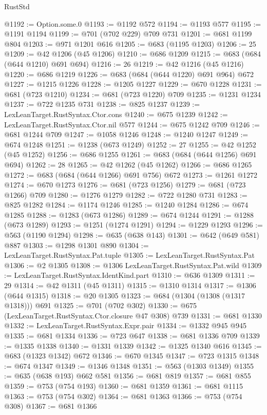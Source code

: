\begin{lexlean}{RustStd}
\begin{coremodule}
@1192 := Option.some.{0}
@1193 := @1192 @572
@1194 := @1193 @577
@1195 := @1191 @1194
@1199 := @701 (@702 @229) @709 @731
@1201 := @681 @1199 @804
@1203 := @971 @1201 @616
@1205 := @683 (@1195 @1203)
@1206 := 25
@1209 := @42 @1206 (@45 @1206)
@1210 := @686 @1209
@1215 := @683 (@684 (@644 @1210) @691 @694)
@1216 := 26
@1219 := @42 @1216 (@45 @1216)
@1220 := @686 @1219
@1226 := @683 (@684 (@644 @1220) @691 @964) @672
@1227 := @1215 @1226
@1228 := @1205 @1227
@1229 := @670 @1228
@1231 := @681 (@723 @1210)
@1234 := @681 (@723 @1220) @709
@1235 := @1231 @1234
@1237 := @722 @1235 @731
@1238 := @825 @1237
@1239 := LexLeanTarget.RustSyntax.Ctor.cons
@1240 := @675 @1239
@1242 := LexLeanTarget.RustSyntax.Ctor.nil @577
@1244 := @675 @1242 @709
@1246 := @681 @1244 @709
@1247 := @1058 @1246
@1248 := @1240 @1247
@1249 := @674 @1248
@1251 := @1238 (@673 @1249)
@1252 := 27
@1255 := @42 @1252 (@45 @1252)
@1256 := @686 @1255
@1261 := @683 (@684 (@644 @1256) @691 @694)
@1262 := 28
@1265 := @42 @1262 (@45 @1262)
@1266 := @686 @1265
@1272 := @683 (@684 (@644 @1266) @691 @756) @672
@1273 := @1261 @1272
@1274 := @670 @1273
@1276 := @681 (@723 @1256)
@1279 := @681 (@723 @1266) @709
@1280 := @1276 @1279
@1282 := @722 @1280 @731
@1283 := @825 @1282
@1284 := @1174 @1246
@1285 := @1240 @1284
@1286 := @674 @1285
@1288 := @1283 (@673 @1286)
@1289 := @674 @1244
@1291 := @1288 (@673 @1289)
@1293 := @1251 (@1274 @1291)
@1294 := @1229 @1293
@1296 := @563 (@1190 @1294)
@1298 := @635 (@638 @143)
@1301 := @642 (@649 @581) @887
@1303 := @1298 @1301 @890
@1304 := LexLeanTarget.RustSyntax.Pat.tuple
@1305 := LexLeanTarget.RustSyntax.Pat
@1306 := @2 @1305
@1308 := @1306 LexLeanTarget.RustSyntax.Pat.wild
@1309 := LexLeanTarget.RustSyntax.IdentKind.part
@1310 := @636 @1309
@1311 := 29
@1314 := @42 @1311 (@45 @1311)
@1315 := @1310 @1314
@1317 := @1306 (@644 @1315)
@1318 := @20 @1305
@1323 := @684 (@1304 (@1308 (@1317 @1318))) @691
@1325 := @701 (@702 @302)
@1330 := @675 (LexLeanTarget.RustSyntax.Ctor.closure @47 @308) @739
@1331 := @681 @1330
@1332 := LexLeanTarget.RustSyntax.Expr.pair
@1334 := @1332 @945 @945
@1335 := @681 @1334
@1336 := @723 @647
@1338 := @681 @1336 @709
@1339 := @1335 @1338
@1340 := @1331 @1339
@1342 := @1325 @1340 @616
@1345 := @683 (@1323 @1342) @672
@1346 := @670 @1345
@1347 := @723 @1315
@1348 := @674 @1347
@1349 := @1346 @1348
@1351 := @563 (@1303 @1349)
@1355 := @635 (@638 @193) @662 @581
@1356 := @681 @819
@1357 := @681 @855
@1359 := @753 (@754 @193)
@1360 := @681 @1359
@1361 := @681 @1115
@1363 := @753 (@754 @302)
@1364 := @681 @1363
@1366 := @753 (@754 @308)
@1367 := @681 @1366

\end{coremodule}
\end{lexlean}
